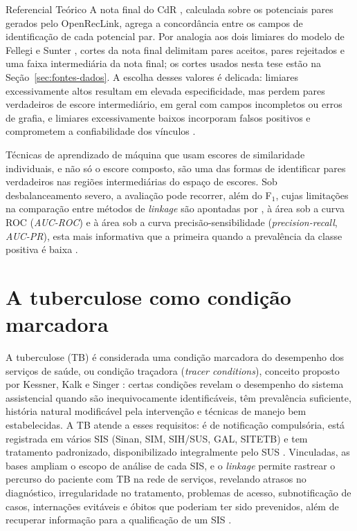 \begin{chapter}{Referencial Teórico}
A nota final do CdR \cite{Lucena2013algoritmos, Jardim2025comparador}, calculada sobre os potenciais pares gerados pelo OpenRecLink, agrega a concordância entre os campos de identificação de cada potencial par. Por analogia aos dois limiares do modelo de Fellegi e Sunter \cite{Fellegi1969theory}, cortes da nota final delimitam pares aceitos, pares rejeitados e uma faixa intermediária da nota final; os cortes usados nesta tese estão na Seção~\ref{sec:fontes-dados}. A escolha desses valores é delicada: limiares excessivamente altos resultam em elevada especificidade, mas perdem pares verdadeiros de escore intermediário, em geral com campos incompletos ou erros de grafia, e limiares excessivamente baixos incorporam falsos positivos e comprometem a confiabilidade dos vínculos \cite{Christen2012book}.

Técnicas de aprendizado de máquina que usam escores de similaridade individuais, e não só o escore composto, são uma das formas de identificar pares verdadeiros nas regiões intermediárias do espaço de escores. Sob desbalanceamento severo, a avaliação pode recorrer, além do F$_1$, cujas limitações na comparação entre métodos de \textit{linkage} são apontadas por , à área sob a curva ROC (\textit{AUC-ROC}) e à área sob a curva precisão-sensibilidade (\textit{precision-recall}, \textit{AUC-PR}), esta mais informativa que a primeira quando a prevalência da classe positiva é baixa \cite{Saito2015aucpr}.

\section{A tuberculose como condição marcadora}\label{sec:tb-marcadora}

A tuberculose (TB) é considerada uma condição marcadora do desempenho dos serviços de saúde, ou condição traçadora (\textit{tracer conditions}), conceito proposto por Kessner, Kalk e Singer \citeyearpar{Kessner1973tracer}: certas condições revelam o desempenho do sistema assistencial quando são inequivocamente identificáveis, têm prevalência suficiente, história natural modificável pela intervenção e técnicas de manejo bem estabelecidas. A TB atende a esses requisitos: é de notificação compulsória, está registrada em vários SIS (Sinan, SIM, SIH/SUS, GAL, SITETB) e tem tratamento padronizado, disponibilizado integralmente pelo SUS \cite{PNCT2019manual}. Vinculadas, as bases ampliam o escopo de análise de cada SIS, e o \textit{linkage} permite rastrear o percurso do paciente com TB na rede de serviços, revelando atrasos no diagnóstico, irregularidade no tratamento, problemas de acesso, subnotificação de casos, internações evitáveis e óbitos que poderiam ter sido prevenidos, além de recuperar informação para a qualificação de um SIS \cite{Sousa2011obitos, Oliveira2012uso}.


\end{chapter}
